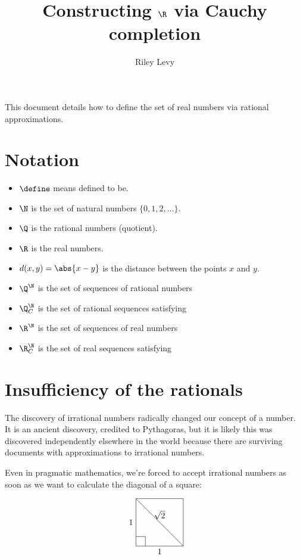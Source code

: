 \documentclass{scrartcl}
\newcommand{\dist}{d}
\begin{document}
\title{Constructing \(\R\) via Cauchy completion}
\author{Riley Levy}
\maketitle{}
This document details how to define the set of real numbers via rational approximations.
\section{Notation}
\begin{itemize}
  \item \(\define\) means defined to be.
  \item \(\N\) is the set of natural numbers \(\{0,1,2,\dots\}\).
  \item \(\Q\) is the rational numbers (quotient).
  \item \(\R\) is the real numbers.
  \item \(\dist(x,y)=\abs{x-y}\) is the distance between the points \(x\) and \(y\).
  \item \(\Q^{\N}\) is the set of sequences of rational numbers
  \item \(\Q^{\N}_{C}\) is the set of rational sequences satisfying 
  \item \(\R^{\N}\) is the set of sequences of real numbers
  \item \(\R^{\N}_{C}\) is the set of real sequences satisfying 
\end{itemize}
\section{Insufficiency of the rationals}
The discovery of irrational numbers radically changed our concept of a number. It is an ancient discovery, credited to Pythagoras, but it is likely this was discovered independently elsewhere in the world because there are surviving documents with approximations to irrational numbers.

Even in pragmatic mathematics, we're forced to accept irrational numbers as soon as we want to calculate the diagonal of a square:

\[
\begin{tikzpicture}[scale=2]
  \draw (0,0) -- node[below]{\(1\)} ++ (1,0);
  \draw (0,0) -- node[left]{\(1\)} ++ (0,1);
  \draw (1,0) -- node[above]{\(\sqrt2\)} (0,1);
  \draw (0,.2) -- (.2,.2) -- (.2,0);
  \draw (1,0) -- (1,1);
  \draw (0,1) -- (1,1);
\end{tikzpicture}
\]
\end{document}
